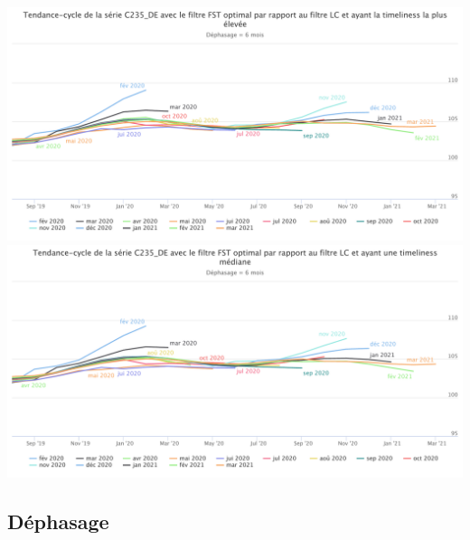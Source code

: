 \documentclass[10pt,xcolor=table,color={dvipsnames,usenames},ignorenonframetext,usepdftitle=false,french]{beamer}
\newcommand\1{\mathds{1}}
\begin{document}
\begin{frame}{}
\protect\hypertarget{section-3}{}
\begin{center}\includegraphics[height=0.5\paperheight]{img/simulations/c235_de_fst_lc_min} \includegraphics[height=0.5\paperheight]{img/simulations/c235_de_fst_lc_med} \end{center}
\end{frame}

\hypertarget{duxe9phasage}{%
\subsection{Déphasage}\label{duxe9phasage}}
\end{document}
